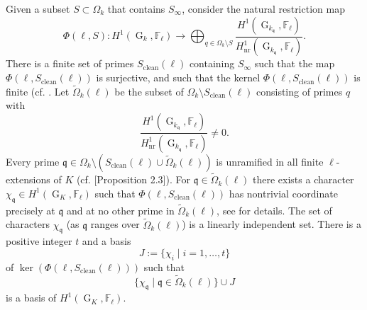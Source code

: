 \documentclass[11pt]{amsart}
\newcommand{\fq}{\mathfrak{q}}
\newcommand{\F}{\mathbb{F}}
\newcommand{\op}[1]{\operatorname{#1}}
\numberwithin{equation}{section}
\begin{document}
\par Given a subset $S\subset \Omega_k$ that contains $S_\infty$, consider the natural restriction map
\[\Phi(\ell, S):H^1(\op{G}_{k}, \F_\ell)\rightarrow \bigoplus_{q\in \Omega_{k}\setminus S} \frac{H^1(\op{G}_{k_{\fq}}, \F_\ell)}{H^1_{\op{nr}}(\op{G}_{k_{\fq}}, \F_\ell)}.\] There is a finite set of primes $S_{\op{clean}}(\ell)$ containing $S_\infty$ such that the map $\Phi(\ell, S_{\op{clean}}(\ell))$ is surjective, and such that the kernel $\Phi(\ell, S_{\op{clean}}(\ell))$ is finite (cf. \cite[Proposition 2.1 and 2.2]{koymanspagano2023}. Let $\widetilde{\Omega}_k(\ell)$ be the subset of $\Omega_k\setminus S_{\op{clean}}(\ell)$ consisting of primes $q$ with \[\frac{H^1(\op{G}_{k_{\fq}}, \F_\ell)}{H^1_{\op{nr}}(\op{G}_{k_{\fq}}, \F_\ell)} \neq 0.\]
Every prime $\fq \in \Omega_k\setminus \left(S_{\op{clean}}(\ell)\cup\widetilde{\Omega}_k(\ell)\right)$ is unramified in all finite $\ell$-extensions of $K$ (cf. \cite{koymanspagano2023}[Proposition 2.3]). For $\fq\in \widetilde{\Omega}_k(\ell)$ there exists a character $\chi_\fq\in H^1(\op{G}_K, \F_\ell)$ such that $\Phi(\ell, S_{\op{clean}}(\ell))$ has nontrivial coordinate precisely at $\fq$ and at no other prime in $\widetilde{\Omega}_k(\ell)$, see \cite[p. 317, line -9]{koymanspagano2023} for details. The set of characters $\chi_\fq$ (as $\fq$ ranges over $\widetilde{\Omega}_k(\ell)$) is a linearly independent set. There is a positive integer $t$ and a basis 
\[J:=\{\chi_i\mid i=1, \dots, t\}\] of $\op{ker}\left(\Phi(\ell, S_{\op{clean}}(\ell))\right)$ such that 
\[\{\chi_\fq\mid \fq\in \widetilde{\Omega}_k(\ell)\}\cup J\] is a basis of $H^1(\op{G}_K, \F_\ell)$. 
\end{document}
